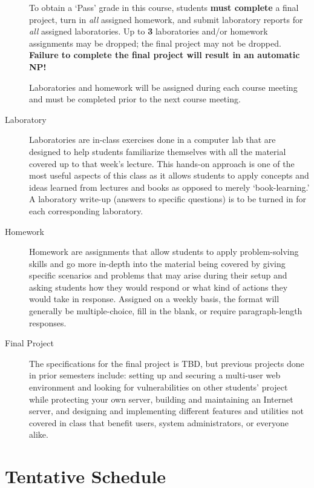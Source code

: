 \documentclass[letterpaper]{article}
\begin{document}
\begin{description}
		To obtain a `Pass' grade in this course, students \textbf{must
		complete} a final project, turn in \emph{all} assigned homework,
		and submit laboratory reports for \emph{all} assigned laboratories.
		Up to \textbf{3} laboratories and/or homework assignments may be dropped; the
		final project may not be dropped.  \textbf{Failure to complete the
		final project will result in an automatic NP!}
	
		Laboratories and homework will be assigned during each course
		meeting and must be completed prior to the next course meeting.

  \item[Laboratory] 
    Laboratories are in-class exercises done in a computer lab that are
		designed to help students familiarize themselves with all the
		material covered up to that week's lecture. This hands-on approach
		is one of the most useful aspects of this class as it allows
		students to apply concepts and ideas learned from lectures and books
		as opposed to merely `book-learning.' A laboratory write-up (answers
		to specific questions) is to be turned in for each corresponding
		laboratory.
		
  \item[Homework]
		Homework are assignments that allow students to apply
		problem-solving skills and go more in-depth into the material being
		covered by giving specific scenarios and problems that may arise
		during their setup and asking students how they would respond or
		what kind of actions they would take in response. Assigned on a
		weekly basis, the format will generally be multiple-choice, fill in
		the blank, or require paragraph-length responses.

  \item[Final Project]
		The specifications for the final project is TBD, but
		previous projects done in prior semesters include: setting up and
		securing a multi-user web environment and looking for
		vulnerabilities on other students' project while protecting your own
		server, building and maintaining an Internet server, and designing
		and implementing different features and utilities not covered in class that benefit users, system administrators, or everyone alike.

\end{description}

\section*{Tentative Schedule}
\end{document}
